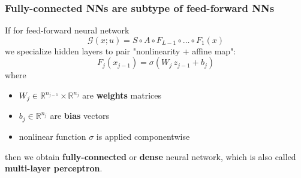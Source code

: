 \documentclass[11pt,aspectratio=169,t]{beamer}
\newcommand{\R}{\mathbb R}
\newcommand{\Model}{\mathcal G}
\begin{document}
\begin{frame}
\frametitle{Fully-connected NNs are subtype of feed-forward NNs}

If for feed-forward neural network
\[
    \Model(x; u) = S \circ A \circ F_{L-1} \circ \dots \circ F_1(x)
\]
we specialize hidden layers to pair "nonlinearity + affine map":
\[
    F_j(x_{j-1}) = \sigma(W_j \, z_{j-1} + b_j)
\]
where
\begin{itemize}
    \item \(W_j \in \R^{n_{j-1}} \times \R^{n_j}\) are \textbf{weights} matrices
    \item \(b_j \in \R^{n_j}\) are \textbf{bias} vectors
    \item nonlinear function \(\sigma\) is applied componentwise
\end{itemize}
then we obtain \textbf{fully-connected} or \textbf{dense} neural network, which
is also called \textbf{multi-layer perceptron}.

\end{frame}
\end{document}
